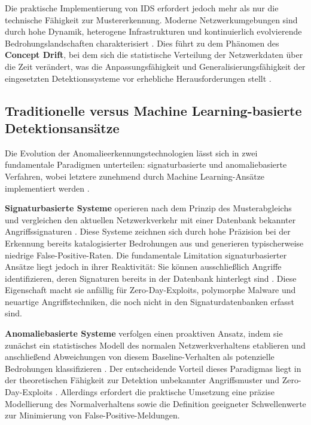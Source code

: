 \documentclass[11pt,a4paper]{article}
\begin{document}
    Die praktische Implementierung von IDS erfordert jedoch mehr als nur die technische Fähigkeit zur Mustererkennung. Moderne Netzwerkumgebungen sind durch hohe Dynamik, heterogene Infrastrukturen und kontinuierlich evolvierende Bedrohungslandschaften charakterisiert \parencite{Gharib2016}. Dies führt zu dem Phänomen des \textbf{Concept Drift}, bei dem sich die statistische Verteilung der Netzwerkdaten über die Zeit verändert, was die Anpassungsfähigkeit und Generalisierungsfähigkeit der eingesetzten Detektionssysteme vor erhebliche Herausforderungen stellt \parencite{Ring2019}.


    \subsection{Traditionelle versus Machine Learning-basierte Detektionsansätze}

    Die Evolution der Anomalieerkennungstechnologien lässt sich in zwei fundamentale Paradigmen unterteilen: signaturbasierte und anomaliebasierte Verfahren, wobei letztere zunehmend durch Machine Learning-Ansätze implementiert werden \parencite{Ring2019, Belavagi2016}.

    \textbf{Signaturbasierte Systeme} operieren nach dem Prinzip des Musterabgleichs und vergleichen den aktuellen Netzwerkverkehr mit einer Datenbank bekannter Angriffssignaturen \parencite{Ring2019}. Diese Systeme zeichnen sich durch hohe Präzision bei der Erkennung bereits katalogisierter Bedrohungen aus und generieren typischerweise niedrige False-Positive-Raten. Die fundamentale Limitation signaturbasierter Ansätze liegt jedoch in ihrer Reaktivität: Sie können ausschließlich Angriffe identifizieren, deren Signaturen bereits in der Datenbank hinterlegt sind \parencite{Vinayakumar2019}. Diese Eigenschaft macht sie anfällig für Zero-Day-Exploits, polymorphe Malware und neuartige Angriffstechniken, die noch nicht in den Signaturdatenbanken erfasst sind.

    \textbf{Anomaliebasierte Systeme} verfolgen einen proaktiven Ansatz, indem sie zunächst ein statistisches Modell des normalen Netzwerkverhaltens etablieren und anschließend Abweichungen von diesem Baseline-Verhalten als potenzielle Bedrohungen klassifizieren \parencite{Ring2019}. Der entscheidende Vorteil dieses Paradigmas liegt in der theoretischen Fähigkeit zur Detektion unbekannter Angriffsmuster und Zero-Day-Exploits \parencite{Vinayakumar2019}. Allerdings erfordert die praktische Umsetzung eine präzise Modellierung des Normalverhaltens sowie die Definition geeigneter Schwellenwerte zur Minimierung von False-Positive-Meldungen.
\end{document}

